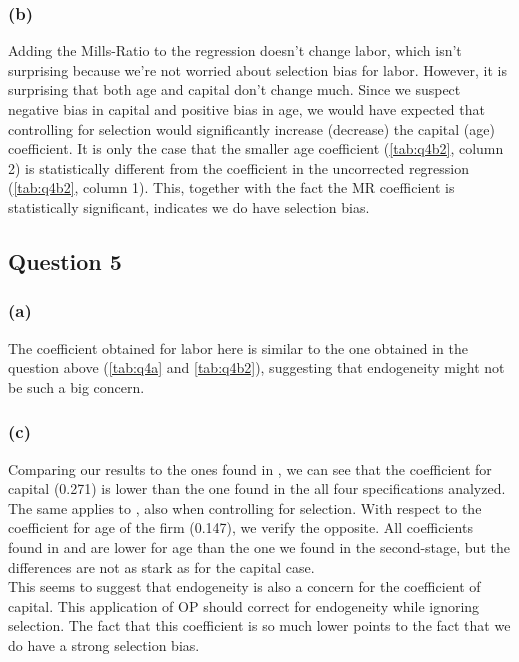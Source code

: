 \documentclass[11pt]{article}
\begin{document}

\FloatBarrier

\subsubsection*{(b)} Adding the Mills-Ratio to the regression doesn't change labor, which isn't surprising because we're not worried about selection bias for labor. However, it is surprising that both age and capital don't change much. Since we suspect negative bias in capital and positive bias in age, we would have expected that controlling for selection would significantly increase (decrease) the capital (age) coefficient. It is only the case that the smaller age coefficient (\autoref{tab:q4b2}, column 2) is statistically different from the coefficient in the uncorrected regression (\autoref{tab:q4b2}, column 1). This, together with the fact the MR coefficient is statistically significant, indicates we do have selection bias.





\FloatBarrier

\subsection*{Question 5} \label{q5}
\subsubsection*{(a)}
The coefficient obtained for labor here is similar to the one obtained in the question above (\autoref{tab:q4a} and \autoref{tab:q4b2}), suggesting that endogeneity might not be such a big concern. 


\FloatBarrier


\subsubsection*{(c)}


Comparing our results to the ones found in , we can see that the coefficient for capital (0.271) is lower than the one found in the all four specifications analyzed. The same applies to , also when controlling for selection. With respect to the coefficient for age of the firm (0.147), we verify the opposite. All coefficients found in  and  are lower for age than the one we found in the second-stage, but the differences are not as stark as for the capital case. \\
This seems to suggest that endogeneity is also a concern for the coefficient of capital. This application of OP should correct for endogeneity while ignoring selection. The fact that this coefficient is so much lower points to the fact that we do have a strong selection bias.
\end{document}
